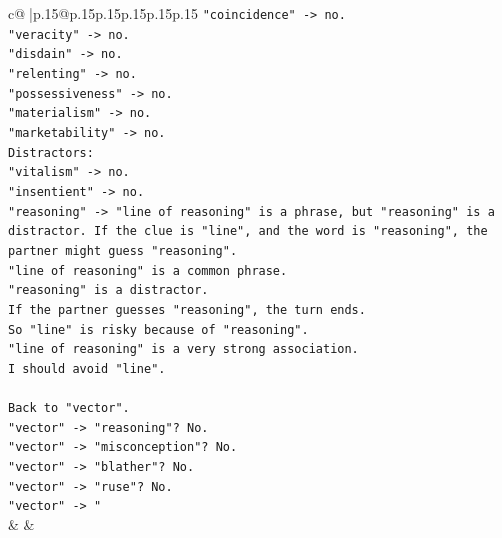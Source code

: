 \documentclass{article}
\begin{document}
{\begin{supertabular}{c@{$\;$}|p{.15\linewidth}@{}p{.15\linewidth}p{.15\linewidth}p{.15\linewidth}p{.15\linewidth}p{.15\linewidth}}
{{{\texttt{"coincidence" {-}> no.} \\
\texttt{"veracity" {-}> no.} \\
\texttt{"disdain" {-}> no.} \\
\texttt{"relenting" {-}> no.} \\
\texttt{"possessiveness" {-}> no.} \\
\texttt{"materialism" {-}> no.} \\
\texttt{"marketability" {-}> no.} \\
\texttt{Distractors:} \\
\texttt{"vitalism" {-}> no.} \\
\texttt{"insentient" {-}> no.} \\
\texttt{"reasoning" {-}> "line of reasoning" is a phrase, but "reasoning" is a distractor. If the clue is "line", and the word is "reasoning", the partner might guess "reasoning".} \\
\texttt{"line of reasoning" is a common phrase.} \\
\texttt{"reasoning" is a distractor.} \\
\texttt{If the partner guesses "reasoning", the turn ends.} \\
\texttt{So "line" is risky because of "reasoning".} \\
\texttt{"line of reasoning" is a very strong association.} \\
\texttt{I should avoid "line".} \\
\\ 
\texttt{Back to "vector".} \\
\texttt{"vector" {-}> "reasoning"? No.} \\
\texttt{"vector" {-}> "misconception"? No.} \\
\texttt{"vector" {-}> "blather"? No.} \\
\texttt{"vector" {-}> "ruse"? No.} \\
\texttt{"vector" {-}> "} \\
            }
        }
    }
    & & \\ \\


\end{supertabular}}
\end{document}
